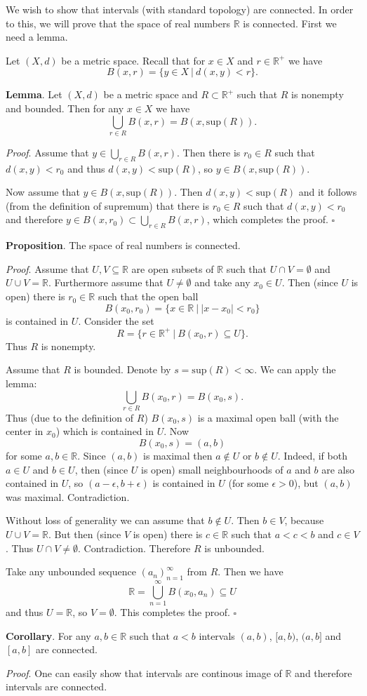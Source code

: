 \documentclass[12pt]{article}
\begin{document}
We wish to show that intervals (with standard topology) are connected. In order to this, we will prove that the space of real numbers $\mathbb{R}$ is connected. First we need a lemma.

Let $(X,d)$ be a metric space. Recall that for $x\in X$ and $r\in\mathbb{R}^{+}$ we have $$B(x,r)=\{y\in X\ |\ d(x,y)<r\}.$$

\textbf{Lemma}. Let $(X,d)$ be a metric space and $R\subset\mathbb{R}^{+}$ such that $R$ is nonempty and bounded. Then for any $x\in X$ we have
$$\bigcup_{r\in R}B(x,r)=B(x,\mathrm{sup}(R)).$$

\textit{Proof}. Assume that $y\in\bigcup_{r\in R}B(x,r)$. Then there is $r_0\in R$ such that $d(x,y)<r_0$ and thus $d(x,y)<\mathrm{sup}(R)$, so $y\in B(x,\mathrm{sup}(R))$.

Now assume that $y\in B(x,\mathrm{sup}(R))$. Then $d(x,y)<\mathrm{sup}(R)$ and it follows (from the definition of supremum) that there is $r_0\in R$ such that $d(x,y)<r_0$ and therefore $y\in B(x,r_0)\subset\bigcup_{r\in R}B(x,r)$, which completes the proof. $\square$


\textbf{Proposition}. The space of real numbers is connected.

\textit{Proof}. Assume that $U,V \subseteq\mathbb{R}$ are open subsets of $\mathbb{R}$ such that $U\cap V = \emptyset$ and $U\cup V = \mathbb{R}$. Furthermore assume that $U \neq \emptyset$ and take any $x_{0} \in U$. Then (since $U$ is open) there is $r_{0}\in\mathbb{R}$ such that the open ball $$B(x_{0},r_{0})=\{ x\in \mathbb{R}\ |\ |x-x_{0}|<r_{0}\} $$
is contained in $U$. Consider the set 
$$R=\{ r\in\mathbb{R}^{+}\ |\ B(x_0,r)\subseteq U\} .$$
Thus $R$ is nonempty.


Assume that $R$ is bounded. Denote by $s=\mathrm{sup}(R)<\infty$. We can apply the lemma:
$$\bigcup_{r\in R} B(x_0,r)=B(x_0,s).$$
Thus (due to the definition of $R$) $B(x_0,s)$ is a maximal open ball (with the center in $x_0$) which is contained in $U$. Now $$B(x_0,s)=(a,b)$$
for some $a,b\in\mathbb{R}$. Since $(a,b)$ is maximal then $a\not\in U$ or $b\not\in U$. Indeed, if both $a\in U$ and $b\in U$, then (since $U$ is open) small neighbourhoods of $a$ and $b$ are also contained in $U$, so $(a-\epsilon,b+\epsilon)$ is contained in $U$ (for some $\epsilon>0$), but $(a,b)$ was maximal. Contradiction.

Without loss of generality we can assume that $b\not\in U$. Then $b\in V$, because $U\cup V=\mathbb{R}$. But then (since $V$ is open) there is $c\in\mathbb{R}$ such that $a<c<b$ and $c\in V$. Thus $U\cap V\neq\emptyset$. Contradiction. Therefore $R$ is unbounded. 


Take any unbounded sequence $(a_n)_{n=1}^{\infty}$ from $R$. Then we have
$$\mathbb{R}=\bigcup_{n=1}^{\infty} B(x_0,a_n)\subseteq U$$
and thus $U=\mathbb{R}$, so $V=\emptyset$. This completes the proof. $\square$

\textbf{Corollary}. For any $a,b\in\mathbb{R}$ such that $a<b$ intervals $(a,b)$, $[a,b)$, $(a,b]$ and $[a,b]$ are connected.

\textit{Proof}. One can easily show that intervals are continous image of $\mathbb{R}$ and therefore intervals are connected.
\end{document}
